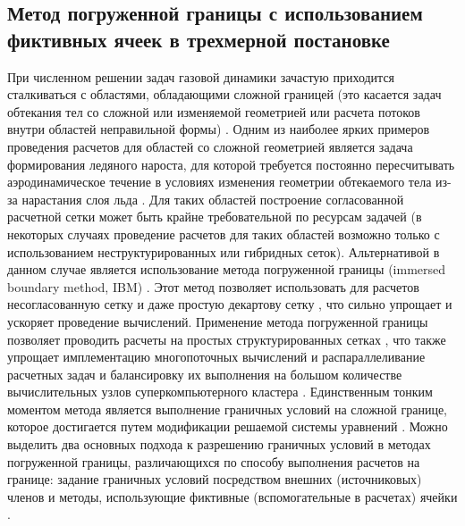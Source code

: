 \subsection{Метод погруженной границы с использованием фиктивных ячеек в трехмерной постановке}\label{sec:text_1_immersed_boundary_method}

При численном решении задач газовой динамики зачастую приходится сталкиваться с областями, обладающими сложной границей (это касается задач обтекания тел со сложной или изменяемой геометрией или расчета потоков внутри областей неправильной формы) \cite{Mahesh2003Turbulent,Ye2020Grid}.
Одним из наиболее ярких примеров проведения расчетов для областей со сложной геометрией является задача формирования ледяного нароста, для которой требуется постоянно пересчитывать аэродинамическое течение в условиях изменения геометрии обтекаемого тела из-за нарастания слоя льда \cite{BourgaultCote2017,Tong2017Remesh,Wright2015LEWICE}.
Для таких областей построение согласованной расчетной сетки может быть крайне требовательной по ресурсам задачей (в некоторых случаях проведение расчетов для таких областей возможно только с использованием неструктурированных или гибридных сеток).
Альтернативой в данном случае является использование метода погруженной границы (immersed boundary method\label{term:immersed_boundary_method}, IBM\label{abbr:ibm}) \cite{Abalakin2018Immersed,Mori2008Immersed,Kim2004Immersed}.
Этот метод позволяет использовать для расчетов несогласованную сетку и даже простую декартову сетку \cite{Clarke1996Cartesian}, что сильно упрощает и ускоряет проведение вычислений.
Применение метода погруженной границы позволяет проводить расчеты на простых структурированных сетках \cite{Farrashkhalvat2003Grid,Rybakov2017Mesh}, что также упрощает имплементацию многопоточных вычислений и распараллеливание расчетных задач и балансировку их выполнения на большом количестве вычислительных узлов суперкомпьютерного кластера \cite{Savin2019RANSILES,Giordano2019Load}.
Единственным тонким моментом метода является выполнение граничных условий на сложной границе, которое достигается путем модификации решаемой системы уравнений \cite{Fadlun2000Immersed}.
Можно выделить два основных подхода к разрешению граничных условий в методах погруженной границы, различающихся по способу выполнения расчетов на границе: задание граничных условий посредством внешних (источниковых) членов \cite{Mittal2005Immersed} и методы, использующие фиктивные (вспомогательные в расчетах) ячейки \cite{Tseng2003Immersed}.

